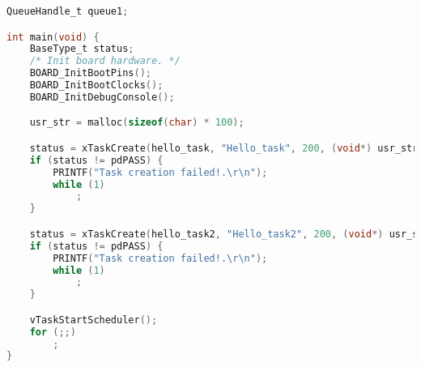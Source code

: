 \begin{lstlisting}[language=c,caption=Problem 1 main, label=list:p1_main]
QueueHandle_t queue1;

int main(void) {
    BaseType_t status;
    /* Init board hardware. */
    BOARD_InitBootPins();
    BOARD_InitBootClocks();
    BOARD_InitDebugConsole();

    usr_str = malloc(sizeof(char) * 100);

    status = xTaskCreate(hello_task, "Hello_task", 200, (void*) usr_str, 2, &t_handle_1);
    if (status != pdPASS) {
        PRINTF("Task creation failed!.\r\n");
        while (1)
            ;
    }

    status = xTaskCreate(hello_task2, "Hello_task2", 200, (void*) usr_str, 3, &t_handle_2);
    if (status != pdPASS) {
        PRINTF("Task creation failed!.\r\n");
        while (1)
            ;
    }

    vTaskStartScheduler();
    for (;;)
        ;
}
\end{lstlisting}
